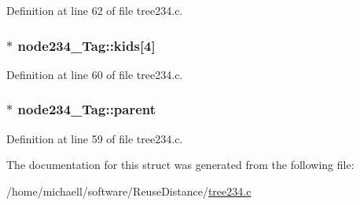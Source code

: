 Definition at line 62 of file tree234.c.

\hypertarget{structnode234___tag_a0f783514c021d86027beb3211b43f3b7}{
\subsubsection[{kids}]{$\ast$ {\bf node234\_\-Tag::kids}\mbox{[}4\mbox{]}}}
\label{structnode234___tag_a0f783514c021d86027beb3211b43f3b7}


Definition at line 60 of file tree234.c.

\hypertarget{structnode234___tag_a3c3bdead5844de4df21b2980e7409157}{
\subsubsection[{parent}]{$\ast$ {\bf node234\_\-Tag::parent}}}
\label{structnode234___tag_a3c3bdead5844de4df21b2980e7409157}


Definition at line 59 of file tree234.c.



The documentation for this struct was generated from the following file:\begin{DoxyCompactItemize}
\item 
/home/michaell/software/ReuseDistance/\hyperlink{tree234_8c}{tree234.c}\end{DoxyCompactItemize}
